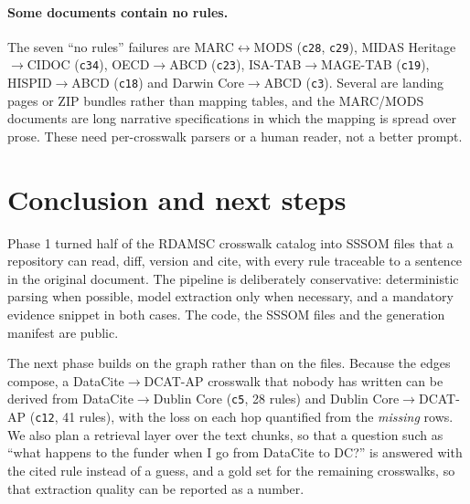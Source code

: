 \documentclass[10pt,twocolumn,a4paper]{extarticle}
\begin{document}
\paragraph{Some documents contain no rules.} The seven ``no rules''
failures are MARC$\leftrightarrow$MODS (\texttt{c28}, \texttt{c29}),
MIDAS Heritage$\to$CIDOC (\texttt{c34}), OECD$\to$ABCD (\texttt{c23}),
ISA-TAB$\to$MAGE-TAB (\texttt{c19}), HISPID$\to$ABCD (\texttt{c18}) and
Darwin Core$\to$ABCD (\texttt{c3}). Several are landing pages or ZIP
bundles rather than mapping tables, and the MARC/MODS documents are long
narrative specifications in which the mapping is spread over prose. These
need per-crosswalk parsers or a human reader, not a better prompt.



\section{Conclusion and next steps}\label{sec:conclusion}

Phase 1 turned half of the RDAMSC crosswalk catalog into SSSOM files
that a repository can read, diff, version and cite, with every rule
traceable to a sentence in the original document. The pipeline is
deliberately conservative: deterministic parsing when possible, model
extraction only when necessary, and a mandatory evidence snippet in both
cases. The code, the SSSOM files and the generation manifest are public.

The next phase builds on the graph rather than on the files. Because the
edges compose, a DataCite$\to$DCAT-AP crosswalk that nobody has written
can be derived from DataCite$\to$Dublin Core (\texttt{c5}, 28 rules) and
Dublin Core$\to$DCAT-AP (\texttt{c12}, 41 rules), with the loss on each
hop quantified from the \emph{missing} rows. We also plan a retrieval
layer over the text chunks, so that a question such as ``what happens to
the funder when I go from DataCite to DC?'' is answered with the cited
rule instead of a guess, and a gold set for the remaining crosswalks, so
that extraction quality can be reported as a number.
\end{document}
